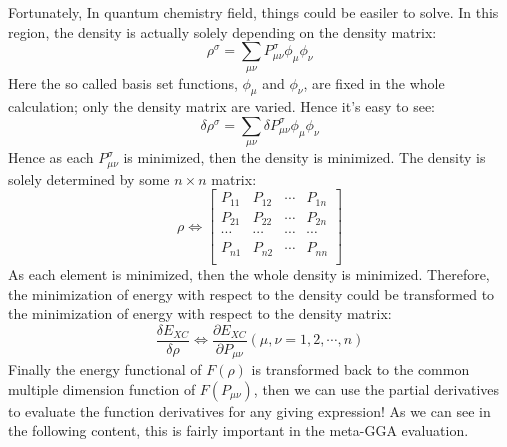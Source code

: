 Fortunately, In quantum chemistry field, things could be easiler to
solve. In this region, the density is actually solely depending on
the density matrix:
\begin{equation}
 \label{minimization_density_vs_density_matrix_eq:1}
\rho^{\sigma} = \sum_{\mu\nu}P_{\mu\nu}^{\sigma}\phi_{\mu}\phi_{\nu} 
\end{equation} 
Here the so called basis set functions, $\phi_{\mu}$ and
$\phi_{\nu}$, are fixed in the whole calculation; only the density
matrix are varied. Hence it's easy to see:
\begin{equation}
  \label{minimization_density_vs_density_matrix_eq:2}
\delta\rho^{\sigma} =
\sum_{\mu\nu}\delta P_{\mu\nu}^{\sigma}\phi_{\mu}\phi_{\nu} 
\end{equation} 
Hence as each $P_{\mu\nu}^{\sigma}$ is minimized, then the density is
minimized. The density is solely determined by some $n\times n$
matrix:
\begin{equation}
 \label{minimization_density_vs_density_matrix_eq:3}
\rho \Leftrightarrow 
\begin{bmatrix}
 P_{11} & P_{12} & \cdots & P_{1n} \\
 P_{21} & P_{22} & \cdots & P_{2n} \\
 \cdots & \cdots & \cdots & \cdots \\
 P_{n1} & P_{n2} & \cdots & P_{nn} \\
\end{bmatrix}
\end{equation}  
As each element is minimized, then the whole density is minimized.
Therefore, the minimization of energy with respect to the density
could be transformed to the minimization of energy with respect to
the density matrix:
\begin{equation}
 \label{minimization_density_vs_density_matrix_eq:4}
\frac{\delta E_{XC}}{\delta \rho} \Leftrightarrow \frac{\partial
E_{XC}}{\partial P_{\mu\nu}} (\mu,\nu = 1,2, \cdots, n)
\end{equation}  
Finally the energy functional of $F(\rho)$ is transformed back to the
common multiple dimension function of $F(P_{\mu\nu})$, then we can
use the partial derivatives to evaluate the function derivatives for
any giving expression! As we can see in the following content, this
is fairly important in the meta-GGA evaluation.


